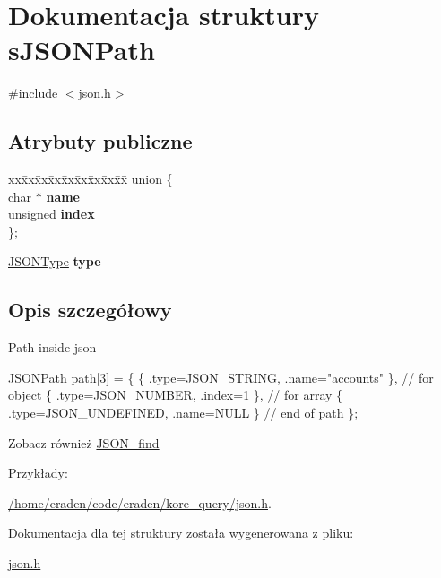\hypertarget{structsJSONPath}{}\section{Dokumentacja struktury s\+J\+S\+O\+N\+Path}
\label{structsJSONPath}


{\ttfamily \#include $<$json.\+h$>$}

\subsection*{Atrybuty publiczne}
\begin{DoxyCompactItemize}
\item 
\begin{tabbing}
xx\=xx\=xx\=xx\=xx\=xx\=xx\=xx\=xx\=\kill
union \{\\
\>char $\ast$ {\bfseries name}\\
\>unsigned {\bfseries index}\\
\}; \hypertarget{structsJSONPath_a4fc60e3341ab5e651d08fb83c79e2496}{}\label{structsJSONPath_a4fc60e3341ab5e651d08fb83c79e2496}
\\

\end{tabbing}\item 
\hyperlink{json_8h_af761d54284482a1af5a01d8f52845b49}{J\+S\+O\+N\+Type} {\bfseries type}\hypertarget{structsJSONPath_a6c4879fb81a51a713dc7867761e3b295}{}\label{structsJSONPath_a6c4879fb81a51a713dc7867761e3b295}

\end{DoxyCompactItemize}


\subsection{Opis szczegółowy}
Path inside json


\begin{DoxyCode}
\hyperlink{structsJSONPath}{JSONPath} path[3] = \{
    \{ .type=JSON\_STRING, .name=\textcolor{stringliteral}{"accounts"} \}, \textcolor{comment}{// for object}
    \{ .type=JSON\_NUMBER, .index=1 \}, \textcolor{comment}{// for array}
    \{ .type=JSON\_UNDEFINED, .name=NULL \} \textcolor{comment}{// end of path}
\};
\end{DoxyCode}


\begin{DoxySeeAlso}{Zobacz również}
\hyperlink{json_8h_a6ea42f7260d5909a1287aca8676a7f3c}{J\+S\+O\+N\+\_\+find} 
\end{DoxySeeAlso}
\begin{Desc}
\item[Przykłady\+: ]\par
\hyperlink{_2home_2eraden_2code_2eraden_2kore_query_2json_8h-example}{/home/eraden/code/eraden/kore\+\_\+query/json.\+h}.\end{Desc}


Dokumentacja dla tej struktury została wygenerowana z pliku\+:\begin{DoxyCompactItemize}
\item 
\hyperlink{json_8h}{json.\+h}\end{DoxyCompactItemize}
